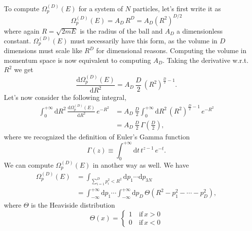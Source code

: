 \documentclass[12pt]{article}
\numberwithin{equation}{section} %
\begin{document}
To compute $\Omega^{(D)}_p (E)$ for a system of $N$ particles, let's first write it as
\begin{equation}
\label{psvolume_general}
\Omega^{(D)}_p (E) = A_D\,R^D = A_D \left( R^2 \right)^{D/2}
\end{equation}
where again $R = \sqrt{2mE}$ is the radius of the ball and $A_D$ a dimensionless constant. $\Omega^{(D)}_p (E)$ must necessarily have this form, as the volume in $D$ dimensions must scale like $R^D$ for dimensional reasons. Computing the volume in momentum space is now equivalent to computing $A_D$. Taking the derivative w.r.t. $R^2$ we get
\begin{equation}
\frac{\mathrm{d} \Omega^{(D)}_p (E)}{\mathrm{d} R^2} = A_D\,\frac{D}{2}\,\left(R^2\right)^{\frac{D}{2}-1}.
\end{equation}
Let's now consider the following integral,
\begin{equation}
\label{altintegral}
\begin{aligned}
\int_0^{+\infty} \mathrm{d}R^2\,\frac{\mathrm{d} \Omega^{(D)}_p (E)}{\mathrm{d} R^2}\,e^{-R^2} &= A_D\,\frac{D}{2} \int_0^{+\infty} \mathrm{d}R^2\,\left(R^2\right)^{\frac{D}{2}-1}\,e^{-R^2}\\
&=A_D\,\frac{D}{2}\,\Gamma\left(\frac{D}{2}\right),
\end{aligned}
\end{equation}
where we recognized the definition of Euler's Gamma function
\begin{equation}
\Gamma(z) \equiv \int_0^{+\infty} \mathrm{d}t\,t^{z-1}\,e^{-t}.
\end{equation}
We can compute $\Omega^{(D)}_p (E)$ in another way as well. We have
\begin{equation}
\label{volumetheta}
\begin{aligned}
\Omega^{(D)}_p (E) &= \int_{\sum_{i=1}^{D} p_i^2 < R^2} \mathrm{d}p_1 \cdots \mathrm{d}p_{3N}\\
&= \int_{-\infty}^{+\infty} \mathrm{d}p_1 \cdots \int_{-\infty}^{+\infty} \mathrm{d}p_{D}\,\Theta\left( R^2 - p_1^2 - \cdots - p_D^2 \right),
\end{aligned}
\end{equation}
where $\Theta$ is the Heaviside distribution
\begin{equation}
\Theta(x) =
\left\lbrace\begin{array}{l}
1\quad\mathrm{if}\,x >0\\
0\quad\mathrm{if}\,x <0
\end{array}\right.
\end{equation}
\end{document}
